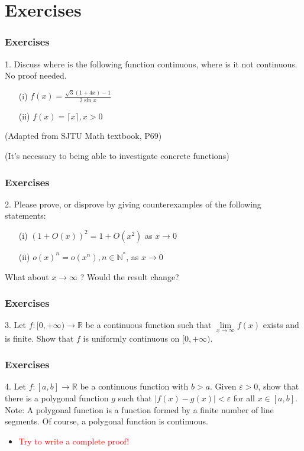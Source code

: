 \documentclass{beamer}
\begin{document}
\section{Exercises}
\begin{frame}
    \frametitle{Exercises}
    1. Discuss where is the following function continuous, where is it not continuous. 
    No proof needed.  \\
    \begin{itemize}
        \item[(i)]$f(x)=\frac{\sqrt{3}{(1+4x)}-1}{2\sin x}$ 
        \item[(ii)]$f(x)= \lceil x\rceil, x>0$ 
    \end{itemize}
      (Adapted from SJTU Math textbook, P69)
    
    \vspace{8em}
    \tiny{(It’s necessary to being able to investigate concrete functions)}
\end{frame}
\begin{frame}
    \frametitle{Exercises}
    2. Please prove, or disprove by giving counterexamples of the following statements: 
    \begin{itemize}
        \item [(i)]  $(1+O(x))^2=1+O(x^2)$ as $x\to 0$ 
        \item [(ii)]  $o(x)^n=o(x^n), n \in \mathbb{N}^*$, as $x \to0$
    \end{itemize}

    \vspace{3em}
    What about $x \to \infty$ ? Would the result change?
\end{frame}
\begin{frame}
    \frametitle{Exercises}
    3. Let $f:[0,+\infty)\to \mathbb{R}$ be a continuous function such that 
    $\underset{x\to \infty}{\lim}⁡ f(x)$ exists and is finite. 
    Show that $f$ is uniformly continuous on $[0, +\infty)$.


\end{frame}
\begin{frame}
    \frametitle{Exercises}
    4. Let $f:[a,b]\to \mathbb{R}$ be a continuous function with $b>a$. 
    Given $\varepsilon>0$, show that there is a polygonal function $g$ such that 
    $|f(x)-g(x)|<\varepsilon$ for all $x \in [a,b]$.\\
    \vspace{3em}
    Note: A polygonal function is a function formed by a finite number of line segments.
     Of course, a polygonal function is continuous. 
    
    \vspace{2em}
    \begin{itemize}
        \item \textcolor{red}{Try to write a complete proof!}
    \end{itemize}
\end{frame}
\end{document}
